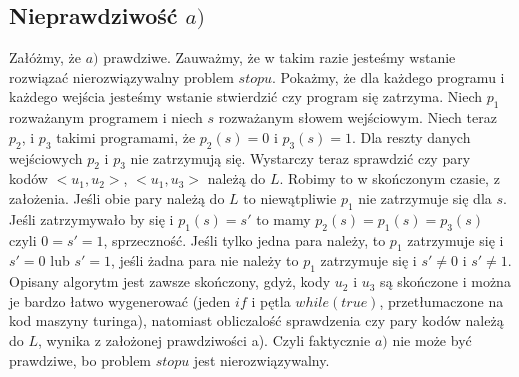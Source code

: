 \documentclass{article}
\begin{document}
\subsection*{Nieprawdziwość $a)$}
Załóżmy, że $a)$ prawdziwe. Zauważmy, że w takim razie jesteśmy wstanie rozwiązać nierozwiązywalny problem $stopu$.
Pokażmy, że dla każdego programu i każdego wejścia jesteśmy wstanie stwierdzić czy program się zatrzyma. \newline
Niech $p_1$ rozważanym programem i niech $s$ rozważanym słowem wejściowym. \newline
Niech teraz $p_2$, i $p_3$ takimi programami, że $p_2(s) = 0$ i $p_3(s) = 1$. Dla reszty danych wejściowych $p_2$ i $p_3$ nie zatrzymują się.
Wystarczy teraz sprawdzić czy pary kodów $<u_1, u_2>$, $<u_1, u_3>$ należą do $L$. Robimy to w skończonym czasie, z założenia. Jeśli obie pary należą do $L$ to niewątpliwie $p_1$ nie zatrzymuje się dla $s$. Jeśli zatrzymywało by się i $p_1(s) = s'$ to mamy $p_2(s)=p_1(s)=p_3(s)$ czyli $0=s'=1$, sprzeczność.
Jeśli tylko jedna para należy, to $p_1$ zatrzymuje się i $s'=0$ lub $s'=1$, jeśli żadna para nie należy to $p_1$ zatrzymuje się i $s' \neq 0$ i $s' \neq 1$. \newline
Opisany algorytm jest zawsze skończony, gdyż, kody $u_2$ i $u_3$ są skończone i można je bardzo łatwo wygenerować (jeden $if$ i pętla $while(true)$, przetłumaczone na kod maszyny turinga), natomiast obliczalość sprawdzenia czy pary kodów należą do $L$, wynika z założonej prawdziwości a). \newline 
Czyli faktycznie $a)$ nie może być prawdziwe, bo problem $stopu$ jest nierozwiązywalny. \newline
\end{document}
